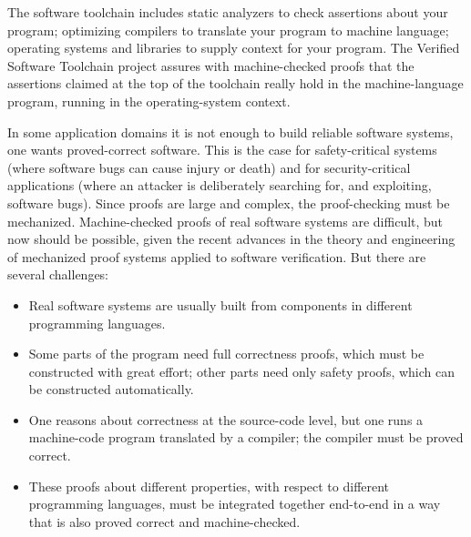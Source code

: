 \documentclass[12pt,twoside]{article}
\begin{document}
\noindent{}The software toolchain includes static analyzers to check assertions
about your program; optimizing compilers to translate your program to
machine language; operating systems and libraries to supply context
for your program. The Verified Software Toolchain project assures with
machine-checked proofs that the assertions claimed at the top of the
toolchain really hold in the machine-language program, running in the
operating-system context.%

In some application domains it is not enough to build reliable
software systems, one wants proved-correct software. This is the case
for safety-critical systems (where software bugs can cause injury or
death) and for security-critical applications (where an attacker is
deliberately searching for, and exploiting, software bugs). Since
proofs are large and complex, the proof-checking must be
mechanized. Machine-checked proofs of real software systems are
difficult, but now should be possible, given the recent advances in
the theory and engineering of mechanized proof systems applied to
software verification. But there are several challenges:%

\begin{itemize}%

\item{}
Real software systems are usually built from components in different
programming languages.%

\item{}
Some parts of the program need full correctness proofs, which must
be constructed with great effort; other parts need only safety
proofs, which can be constructed automatically.%

\item{}
One reasons about correctness at the source-code level, but one runs
a machine-code program translated by a compiler; the compiler must
be proved correct.%

\item{}
These proofs about different properties, with respect to different
programming languages, must be integrated together end-to-end in a
way that is also proved correct and machine-checked.%
\end{itemize}%
\end{document}
